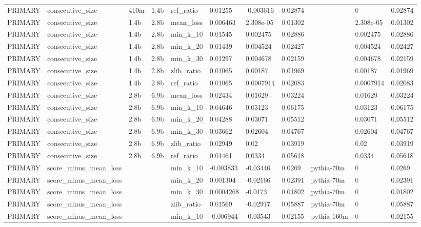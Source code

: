 \begin{tabular}{lllllllllll}
PRIMARY & consecutive\_size & 410m & 1.4b & ref\_ratio & 0.01255 & -0.003616 & 0.02874 &  & 0 & 0.02874 \\
PRIMARY & consecutive\_size & 1.4b & 2.8b & mean\_loss & 0.006463 & 2.308e-05 & 0.01302 &  & 2.308e-05 & 0.01302 \\
PRIMARY & consecutive\_size & 1.4b & 2.8b & min\_k\_10 & 0.01545 & 0.002475 & 0.02886 &  & 0.002475 & 0.02886 \\
PRIMARY & consecutive\_size & 1.4b & 2.8b & min\_k\_20 & 0.01439 & 0.004524 & 0.02427 &  & 0.004524 & 0.02427 \\
PRIMARY & consecutive\_size & 1.4b & 2.8b & min\_k\_30 & 0.01297 & 0.004678 & 0.02159 &  & 0.004678 & 0.02159 \\
PRIMARY & consecutive\_size & 1.4b & 2.8b & zlib\_ratio & 0.01065 & 0.00187 & 0.01969 &  & 0.00187 & 0.01969 \\
PRIMARY & consecutive\_size & 1.4b & 2.8b & ref\_ratio & 0.01065 & 0.0007914 & 0.02083 &  & 0.0007914 & 0.02083 \\
PRIMARY & consecutive\_size & 2.8b & 6.9b & mean\_loss & 0.02434 & 0.01629 & 0.03224 &  & 0.01629 & 0.03224 \\
PRIMARY & consecutive\_size & 2.8b & 6.9b & min\_k\_10 & 0.04646 & 0.03123 & 0.06175 &  & 0.03123 & 0.06175 \\
PRIMARY & consecutive\_size & 2.8b & 6.9b & min\_k\_20 & 0.04288 & 0.03071 & 0.05512 &  & 0.03071 & 0.05512 \\
PRIMARY & consecutive\_size & 2.8b & 6.9b & min\_k\_30 & 0.03662 & 0.02604 & 0.04767 &  & 0.02604 & 0.04767 \\
PRIMARY & consecutive\_size & 2.8b & 6.9b & zlib\_ratio & 0.02949 & 0.02 & 0.03919 &  & 0.02 & 0.03919 \\
PRIMARY & consecutive\_size & 2.8b & 6.9b & ref\_ratio & 0.04461 & 0.0334 & 0.05618 &  & 0.0334 & 0.05618 \\
PRIMARY & score\_minus\_mean\_loss &  &  & min\_k\_10 & -0.003833 & -0.03446 & 0.0269 & pythia-70m & 0 & 0.0269 \\
PRIMARY & score\_minus\_mean\_loss &  &  & min\_k\_20 & 0.001304 & -0.02166 & 0.02391 & pythia-70m & 0 & 0.02391 \\
PRIMARY & score\_minus\_mean\_loss &  &  & min\_k\_30 & 0.0004268 & -0.0173 & 0.01802 & pythia-70m & 0 & 0.01802 \\
PRIMARY & score\_minus\_mean\_loss &  &  & zlib\_ratio & 0.01569 & -0.02917 & 0.05887 & pythia-70m & 0 & 0.05887 \\
PRIMARY & score\_minus\_mean\_loss &  &  & min\_k\_10 & -0.006944 & -0.03543 & 0.02155 & pythia-160m & 0 & 0.02155 \\

\end{tabular}

